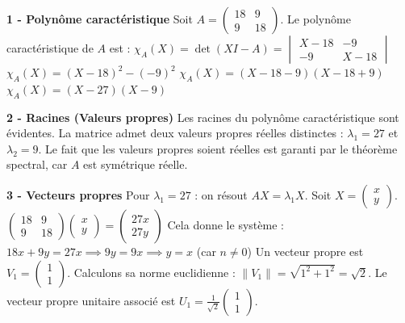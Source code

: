 \documentclass[11pt,a4paper]{article}
\begin{document}
\textbf{1 - Polynôme caractéristique}
Soit $A = \begin{pmatrix} 18 & 9 \\ 9 & 18 \end{pmatrix}$.
Le polynôme caractéristique de $A$ est :
$\chi_A(X) = \det(X I - A) = \begin{vmatrix} X - 18 & -9 \\ -9 & X - 18 \end{vmatrix}$
$\chi_A(X) = (X - 18)^2 - (-9)^2$
$\chi_A(X) = (X - 18 - 9)(X - 18 + 9)$
$\chi_A(X) = (X - 27)(X - 9)$

\textbf{2 - Racines (Valeurs propres)}
Les racines du polynôme caractéristique sont évidentes. La matrice admet deux valeurs propres réelles distinctes :
$\lambda_1 = 27$ et $\lambda_2 = 9$.
Le fait que les valeurs propres soient réelles est garanti par le théorème spectral, car $A$ est symétrique réelle.

\textbf{3 - Vecteurs propres}
Pour $\lambda_1 = 27$ : on résout $AX = \lambda_1 X$.
Soit $X = \begin{pmatrix} x \\ y \end{pmatrix}$.
$\begin{pmatrix} 18 & 9 \\ 9 & 18 \end{pmatrix} \begin{pmatrix} x \\ y \end{pmatrix} = \begin{pmatrix} 27x \\ 27y \end{pmatrix}$
Cela donne le système :
$18x + 9y = 27x \implies 9y = 9x \implies y = x$ (car $n \neq 0$)
Un vecteur propre est $V_1 = \begin{pmatrix} 1 \\ 1 \end{pmatrix}$.
Calculons sa norme euclidienne : $\|V_1\| = \sqrt{1^2 + 1^2} = \sqrt{2}$.
Le vecteur propre unitaire associé est $U_1 = \frac{1}{\sqrt{2}} \begin{pmatrix} 1 \\ 1 \end{pmatrix}$.
\end{document}

